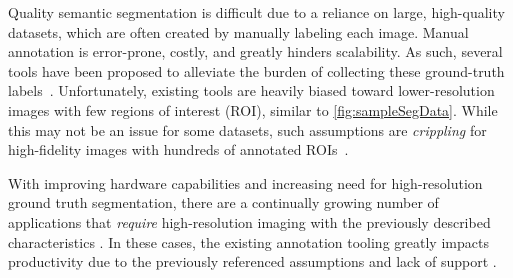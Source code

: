 Quality semantic segmentation is difficult due to a reliance on large, high-quality datasets, which are often created by manually labeling each image.
Manual annotation is error-prone, costly, and greatly hinders scalability. As such, several tools have been proposed to alleviate the burden of collecting these ground-truth labels~\cite{BestImageAnnotation}.
Unfortunately, existing tools are heavily biased toward lower-resolution images with few regions of interest (ROI), similar to \autoref{fig:sampleSegData}.
While this may not be an issue for some datasets, such assumptions are \emph{crippling} for high-fidelity images with hundreds of annotated ROIs~\cite{Ladicky_whatWhereCombiningCRFs,Wang_multiLabelImageAnnotation}.



With improving hardware capabilities and increasing need for high-resolution ground truth segmentation, there are a continually growing number of applications that \textit{require} high-resolution imaging with the previously described characteristics \cite{Mohajerani_cloudRemoteSensing,Demochkina_improvingOneShotXray}.
In these cases, the existing annotation tooling greatly impacts productivity due to the previously referenced assumptions and lack of support \cite{SpaceNet2020-lb}.

